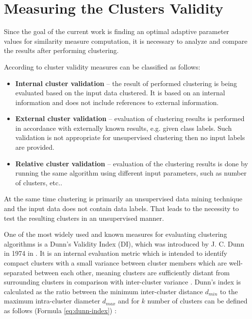 \section{Measuring the Clusters Validity}

Since the goal of the current work is finding an optimal adaptive parameter values for similarity measure computation, it is necessary to analyze and compare the results after performing clustering. 

According to \cite{online:dunn_cl_valid} cluster validity measures can be classified as follows:

\begin{itemize}
	\item \textbf{Internal cluster validation} -- the result of performed clustering is being evaluated based on the input data clustered. It is based on an internal information and does not include references to external information.
	\item \textbf{External cluster validation} -- evaluation of clustering results is performed in accordance with externally known results, e.g. given class labels. Such validation is not appropriate for unsupervised clustering then no input labels are provided.
	\item \textbf{Relative cluster validation} -- evaluation of the clustering results is done by running the same algorithm using different input parameters, such as number of clusters, etc..
\end{itemize}

At the same time clustering is primarily an unsupervised data mining technique and the input data does not contain data labels. That leads to the necessity to test the resulting clusters in an unsupervised manner. 

One of the most widely used and known measures for evaluating clustering algorithms is a Dunn's Validity Index (DI), which was introduced by J. C. Dunn in 1974 in \cite{article:dunn_orig}. It is an internal evaluation metric which is intended to identify compact clusters with a small variance between cluster members which are well-separated between each other, meaning clusters are sufficiently distant from surrounding clusters in comparison with inter-cluster variance \cite{online:hier_clust_r}. Dunn's index is calculated as the ratio between the minimum inter-cluster distance $d_{min}$ to the maximum intra-cluster diameter $d_{max}$ and for $k$ number of clusters can be defined as follows (Formula \ref{eq:dunn-index}) \cite{article:quant_eval_perf_clust}:

